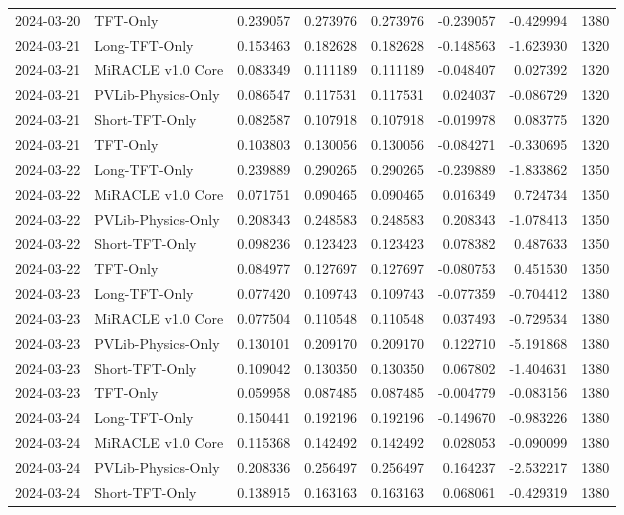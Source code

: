 \begin{tabular}{llrrrrrr}
2024-03-20 & TFT-Only & 0.239057 & 0.273976 & 0.273976 & -0.239057 & -0.429994 & 1380 \\
2024-03-21 & Long-TFT-Only & 0.153463 & 0.182628 & 0.182628 & -0.148563 & -1.623930 & 1320 \\
2024-03-21 & MiRACLE v1.0 Core & 0.083349 & 0.111189 & 0.111189 & -0.048407 & 0.027392 & 1320 \\
2024-03-21 & PVLib-Physics-Only & 0.086547 & 0.117531 & 0.117531 & 0.024037 & -0.086729 & 1320 \\
2024-03-21 & Short-TFT-Only & 0.082587 & 0.107918 & 0.107918 & -0.019978 & 0.083775 & 1320 \\
2024-03-21 & TFT-Only & 0.103803 & 0.130056 & 0.130056 & -0.084271 & -0.330695 & 1320 \\
2024-03-22 & Long-TFT-Only & 0.239889 & 0.290265 & 0.290265 & -0.239889 & -1.833862 & 1350 \\
2024-03-22 & MiRACLE v1.0 Core & 0.071751 & 0.090465 & 0.090465 & 0.016349 & 0.724734 & 1350 \\
2024-03-22 & PVLib-Physics-Only & 0.208343 & 0.248583 & 0.248583 & 0.208343 & -1.078413 & 1350 \\
2024-03-22 & Short-TFT-Only & 0.098236 & 0.123423 & 0.123423 & 0.078382 & 0.487633 & 1350 \\
2024-03-22 & TFT-Only & 0.084977 & 0.127697 & 0.127697 & -0.080753 & 0.451530 & 1350 \\
2024-03-23 & Long-TFT-Only & 0.077420 & 0.109743 & 0.109743 & -0.077359 & -0.704412 & 1380 \\
2024-03-23 & MiRACLE v1.0 Core & 0.077504 & 0.110548 & 0.110548 & 0.037493 & -0.729534 & 1380 \\
2024-03-23 & PVLib-Physics-Only & 0.130101 & 0.209170 & 0.209170 & 0.122710 & -5.191868 & 1380 \\
2024-03-23 & Short-TFT-Only & 0.109042 & 0.130350 & 0.130350 & 0.067802 & -1.404631 & 1380 \\
2024-03-23 & TFT-Only & 0.059958 & 0.087485 & 0.087485 & -0.004779 & -0.083156 & 1380 \\
2024-03-24 & Long-TFT-Only & 0.150441 & 0.192196 & 0.192196 & -0.149670 & -0.983226 & 1380 \\
2024-03-24 & MiRACLE v1.0 Core & 0.115368 & 0.142492 & 0.142492 & 0.028053 & -0.090099 & 1380 \\
2024-03-24 & PVLib-Physics-Only & 0.208336 & 0.256497 & 0.256497 & 0.164237 & -2.532217 & 1380 \\
2024-03-24 & Short-TFT-Only & 0.138915 & 0.163163 & 0.163163 & 0.068061 & -0.429319 & 1380 \\

\end{tabular}
